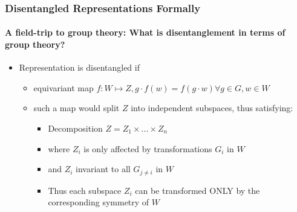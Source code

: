 \documentclass[9pt]{beamer}
\begin{document}
\begin{frame}
\frametitle{Disentangled Representations Formally}
\framesubtitle{A field-trip to group theory: What is disentanglement in terms of group theory?}
\begin{itemize}%
	\item Representation is disentangled if
	\begin{itemize}
		\item equivariant map $f:W \mapsto Z, g \cdot f(w) = f(g\cdot w) \forall g \in G,w \in W$ %
		\item such a map would split $Z$ into independent subspaces, thus satisfying:
		\begin{itemize}
			\item Decomposition $Z = Z_{1} \times ... \times Z_{n}$
			\item where $Z_{i}$ is only affected by transformations $G_i$ in $W$%
			\item and $Z_i$ invariant to all $G_{j \neq i}$ in $W$ %
			\item Thus each subspace $Z_i$ can be transformed ONLY by the corresponding symmetry of $W$%
		\end{itemize}
	\end{itemize}
\end{itemize}
\end{frame} 
\end{document}
